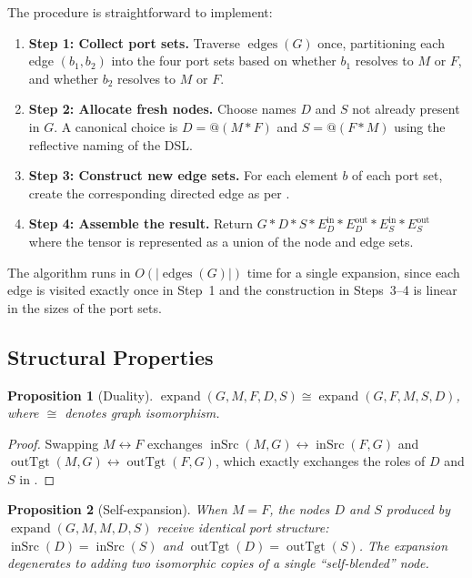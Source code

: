 \documentclass[11pt, a4paper]{article}
\theoremstyle{definition}
\theoremstyle{plain}
\newtheorem{proposition}{Proposition}[section]
\theoremstyle{remark}
\newcommand{\edges}{\operatorname{edges}}
\newcommand{\inSrc}{\operatorname{inSrc}}
\newcommand{\outTgt}{\operatorname{outTgt}}
\newcommand{\expand}{\operatorname{expand}}
\newcommand{\tensor}{\mathbin{*}}
\begin{document}
The procedure is straightforward to implement:

\begin{enumerate}[leftmargin=3em]
  \item \textbf{Step 1: Collect port sets.}  Traverse $\edges(G)$ once, partitioning
    each edge $(b_1, b_2)$ into the four port sets based on whether $b_1$
    resolves to $M$ or $F$, and whether $b_2$ resolves to $M$ or $F$.

  \item \textbf{Step 2: Allocate fresh nodes.}  Choose names $D$ and $S$ not already
    present in $G$.  A canonical choice is $D = @(M \tensor F)$ and
    $S = @(F \tensor M)$ using the reflective naming of the DSL.

  \item \textbf{Step 3: Construct new edge sets.}  For each element $b$ of each port
    set, create the corresponding directed edge as per .

  \item \textbf{Step 4: Assemble the result.}  Return $G \tensor D \tensor S \tensor
    E_D^{\mathrm{in}} \tensor E_D^{\mathrm{out}} \tensor E_S^{\mathrm{in}}
    \tensor E_S^{\mathrm{out}}$ where the tensor is represented as a union of
    the node and edge sets.
\end{enumerate}

The algorithm runs in $O(|\edges(G)|)$ time for a single expansion, since each
edge is visited exactly once in Step~1 and the construction in Steps~3--4 is
linear in the sizes of the port sets.

\subsection{Structural Properties}

\begin{proposition}[Duality]
\label{prop:duality}
$\expand(G, M, F, D, S) \cong \expand(G, F, M, S, D)$,
where $\cong$ denotes graph isomorphism.
\end{proposition}
\begin{proof}
Swapping $M \leftrightarrow F$ exchanges $\inSrc(M,G) \leftrightarrow
\inSrc(F,G)$ and $\outTgt(M,G) \leftrightarrow \outTgt(F,G)$, which exactly
exchanges the roles of $D$ and $S$ in .
\end{proof}

\begin{proposition}[Self-expansion]
\label{prop:self}
When $M = F$, the nodes $D$ and $S$ produced by $\expand(G, M, M, D, S)$
receive identical port structure: $\inSrc(D) = \inSrc(S)$ and
$\outTgt(D) = \outTgt(S)$.  The expansion degenerates to adding two
isomorphic copies of a single ``self-blended'' node.
\end{proposition}
\end{document}
